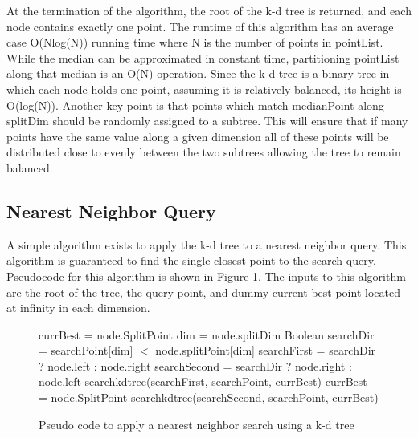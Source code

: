 At the termination of the algorithm, the root of the k-d tree is returned, and each node contains exactly one point.  The runtime of this algorithm has an average case O(Nlog(N)) running time where N is the number of points in pointList.  While the median can be approximated in constant time, partitioning pointList along that median is an O(N) operation.  Since the k-d tree is a binary tree in which each node holds one point, assuming it is relatively balanced, its height is O(log(N)).  Another key point is that points which match medianPoint along splitDim should be randomly assigned to a subtree.  This will ensure that if many points have the same value along a given dimension all of these points will be distributed close to evenly between the two subtrees allowing the tree to remain balanced.

\subsection{Nearest Neighbor Query}
\label{sec:kdquery}

A simple algorithm exists to apply the k-d tree to a nearest neighbor query.  This algorithm is guaranteed to find the single closest point to the search query.  Pseudocode for this algorithm is shown in Figure \ref{alg:querykd}.  The inputs to this algorithm are the root of the tree, the query point, and dummy current best point located at infinity in each dimension.

\begin{figure}
\begin{algorithmic}
			\State currBest = node.SplitPoint
		\EndIf
		\State \Return
	\EndIf
	\State
	\State dim = node.splitDim
	\State Boolean searchDir = searchPoint[dim] $<$ node.splitPoint[dim]
	\State searchFirst = searchDir ? node.left : node.right
	\State searchSecond = searchDir ? node.right : node.left
	\State searchkdtree(searchFirst, searchPoint, currBest)
	\State
		\State currBest = node.SplitPoint
	\EndIf
		\State searchkdtree(searchSecond, searchPoint, currBest)
	\EndIf

\EndFunction
\end{algorithmic}
\caption{Pseudo code to apply a nearest neighbor search using a k-d tree}
\label{alg:querykd}
\end{figure}

